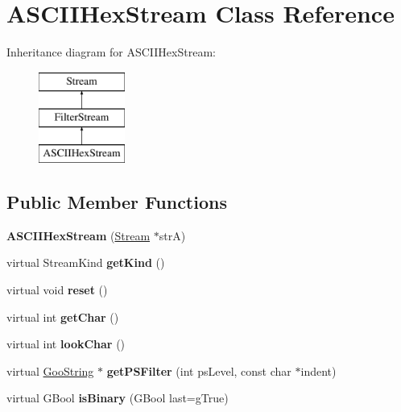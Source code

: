 \hypertarget{class_a_s_c_i_i_hex_stream}{}\section{A\+S\+C\+I\+I\+Hex\+Stream Class Reference}
\label{class_a_s_c_i_i_hex_stream}
Inheritance diagram for A\+S\+C\+I\+I\+Hex\+Stream\+:\begin{figure}[H]
\begin{center}
\leavevmode
\includegraphics[height=3.000000cm]{class_a_s_c_i_i_hex_stream}
\end{center}
\end{figure}
\subsection*{Public Member Functions}
\begin{DoxyCompactItemize}
\item 
\mbox{\label{class_a_s_c_i_i_hex_stream_acbcd403e64af7422ca6fbb3a22fcbb33}} 
{\bfseries A\+S\+C\+I\+I\+Hex\+Stream} (\hyperlink{class_stream}{Stream} $\ast$strA)
\item 
\mbox{\label{class_a_s_c_i_i_hex_stream_a56250b382a6de563f2749140376a30ea}} 
virtual Stream\+Kind {\bfseries get\+Kind} ()
\item 
\mbox{\label{class_a_s_c_i_i_hex_stream_a8a9392b9ae9fe27f66e84c34694ed6a1}} 
virtual void {\bfseries reset} ()
\item 
\mbox{\label{class_a_s_c_i_i_hex_stream_a1237be3f9af40f99c09052b1e5d61d06}} 
virtual int {\bfseries get\+Char} ()
\item 
\mbox{\label{class_a_s_c_i_i_hex_stream_ad538d3550a3352cdcf34adbd487a8a75}} 
virtual int {\bfseries look\+Char} ()
\item 
\mbox{\label{class_a_s_c_i_i_hex_stream_af3e85dfb66bc7f9920eed4698559e3b1}} 
virtual \hyperlink{class_goo_string}{Goo\+String} $\ast$ {\bfseries get\+P\+S\+Filter} (int ps\+Level, const char $\ast$indent)
\item 
\mbox{\label{class_a_s_c_i_i_hex_stream_a23bde965d6218702642431abed2a2e42}} 
virtual G\+Bool {\bfseries is\+Binary} (G\+Bool last=g\+True)
\end{DoxyCompactItemize}

